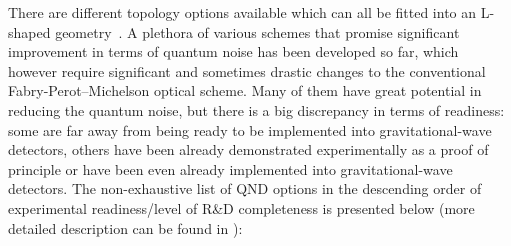 There are different topology options available which can all be fitted into an L-shaped geometry~\cite{2019_LivRevRel_Danilishin}. A plethora of various schemes that promise significant improvement in terms of quantum noise has been developed so far, which however require significant and sometimes drastic changes to 
the conventional Fabry-Perot--Michelson optical scheme. Many of them have great potential in reducing the quantum noise, but there is a big discrepancy in terms of readiness: some are far away from being ready to be implemented into gravitational-wave detectors, others have been already demonstrated experimentally as a proof of principle or have been even already implemented into gravitational-wave detectors. 
The non-exhaustive list of QND options in the descending order of experimental readiness/level of R\&D completeness 
 is presented below (more detailed description can be found in \cite{2019_LivRevRel_Danilishin}):
